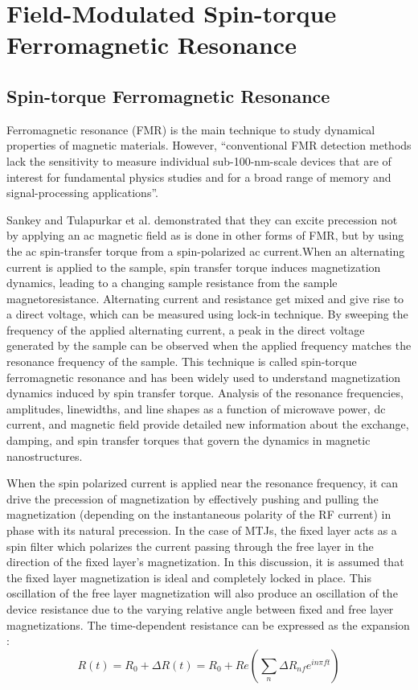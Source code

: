 \chapter{Field-Modulated Spin-torque Ferromagnetic Resonance}

\section{Spin-torque Ferromagnetic Resonance}

Ferromagnetic resonance (FMR) is the main technique to study dynamical properties
of magnetic materials. However, “conventional FMR detection methods lack the sensitivity
to measure individual sub-100-nm-scale devices that are of interest for fundamental
physics studies and for a broad range of memory and signal-processing applications”\cite{Sankey2006}.

Sankey and Tulapurkar et al. demonstrated that they can excite precession not by applying
an ac magnetic field as is done in other forms of FMR, but by using the ac spin-transfer
torque from a spin-polarized ac current.When an alternating current is applied to the
sample\cite{Sankey2006}\cite{Tulapurkar2005}, spin transfer torque induces magnetization dynamics, leading to a changing sample resistance from the sample magnetoresistance. Alternating current and resistance get mixed and give rise to a direct voltage, which can be measured using lock-in technique. By
sweeping the frequency of the applied alternating current, a peak in the direct voltage
generated by the sample can be observed when the applied frequency matches the
resonance frequency of the sample. This technique is called spin-torque ferromagnetic
resonance\cite{Sankey2006} and has been widely used to understand magnetization dynamics induced by
spin transfer torque. Analysis of the resonance frequencies, amplitudes, linewidths, and
line shapes as a function of microwave power, dc current, and magnetic field provide
detailed new information about the exchange, damping\cite{FMR_damping}\cite{FMR_damping2}, and spin transfer torques that
govern the dynamics in magnetic nanostructures\cite{Sankey2006}.

When the spin polarized current is applied near the resonance frequency, it can drive the precession of magnetization by effectively pushing and pulling the
magnetization (depending on the instantaneous polarity of the RF current) in phase with its
natural precession. In the case of MTJs, the fixed layer acts as a spin filter which polarizes the current passing through the free layer in the direction of the fixed layer’s magnetization. In this discussion, it is assumed that the fixed layer magnetization is ideal and completely locked in place. This oscillation of the free layer magnetization will also produce an oscillation of the device resistance due to the varying relative angle between fixed and free layer
magnetizations. The time-dependent
resistance can be expressed as the expansion \cite{Sankey2006}:
\begin{equation}\label{eq:RvsT}
R(t) = R_{0} + \Delta R(t) = R_{0} + Re(\sum_n \Delta R_{nf} e^{in\pi ft}) 
\end{equation}

